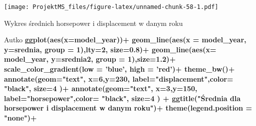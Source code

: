 \documentclass[
]{article}
\newenvironment{Shaded}{\begin{snugshade}}{\end{snugshade}}
\newcommand{\DataTypeTok}[1]{\textcolor[rgb]{0.13,0.29,0.53}{#1}}
\newcommand{\DecValTok}[1]{\textcolor[rgb]{0.00,0.00,0.81}{#1}}
\newcommand{\FloatTok}[1]{\textcolor[rgb]{0.00,0.00,0.81}{#1}}
\newcommand{\KeywordTok}[1]{\textcolor[rgb]{0.13,0.29,0.53}{\textbf{#1}}}
\newcommand{\NormalTok}[1]{#1}
\newcommand{\OperatorTok}[1]{\textcolor[rgb]{0.81,0.36,0.00}{\textbf{#1}}}
\newcommand{\StringTok}[1]{\textcolor[rgb]{0.31,0.60,0.02}{#1}}
\begin{document}
\texttt{[image: ProjektMS\_files/figure-latex/unnamed-chunk-58-1.pdf]}

Wykres średnich horsepower i displacement w danym roku

\begin{Shaded}
\begin{Highlighting}[]
\NormalTok{Autko }\OperatorTok{%>%}\StringTok{ }\KeywordTok{group_by}\NormalTok{(model_year)}\OperatorTok{%>%}\StringTok{ }\KeywordTok{summarise}\NormalTok{(}\DataTypeTok{srednia =} \KeywordTok{mean}\NormalTok{(horsepower), }\DataTypeTok{srednia2 =} \KeywordTok{mean}\NormalTok{(displacement)) }\OperatorTok{%>%}
\StringTok{  }\KeywordTok{ggplot}\NormalTok{(}\KeywordTok{aes}\NormalTok{(}\DataTypeTok{x=}\NormalTok{model_year))}\OperatorTok{+}
\StringTok{  }\KeywordTok{geom_line}\NormalTok{(}\KeywordTok{aes}\NormalTok{(}\DataTypeTok{x =}\NormalTok{ model_year, }\DataTypeTok{y=}\NormalTok{srednia, }\DataTypeTok{group =} \DecValTok{1}\NormalTok{),}\DataTypeTok{lty=}\DecValTok{2}\NormalTok{, }\DataTypeTok{size=}\FloatTok{0.8}\NormalTok{)}\OperatorTok{+}
\StringTok{  }\KeywordTok{geom_line}\NormalTok{(}\KeywordTok{aes}\NormalTok{(}\DataTypeTok{x=}\NormalTok{ model_year, }\DataTypeTok{y=}\NormalTok{srednia2, }\DataTypeTok{group =} \DecValTok{1}\NormalTok{),}\DataTypeTok{size=}\FloatTok{1.2}\NormalTok{)}\OperatorTok{+}
\StringTok{  }\KeywordTok{scale_color_gradient}\NormalTok{(}\DataTypeTok{low =} \StringTok{'blue'}\NormalTok{, }\DataTypeTok{high =} \StringTok{'red'}\NormalTok{)}\OperatorTok{+}
\StringTok{  }\KeywordTok{theme_bw}\NormalTok{()}\OperatorTok{+}
\StringTok{  }\KeywordTok{annotate}\NormalTok{(}\DataTypeTok{geom=}\StringTok{"text"}\NormalTok{, }\DataTypeTok{x=}\DecValTok{6}\NormalTok{,}\DataTypeTok{y=}\DecValTok{230}\NormalTok{,}
           \DataTypeTok{label=}\StringTok{"displacement"}\NormalTok{,}\DataTypeTok{color=} \StringTok{"black"}\NormalTok{, }\DataTypeTok{size=}\DecValTok{4}\NormalTok{ )}\OperatorTok{+}
\StringTok{  }\KeywordTok{annotate}\NormalTok{(}\DataTypeTok{geom=}\StringTok{"text"}\NormalTok{, }\DataTypeTok{x=}\DecValTok{3}\NormalTok{,}\DataTypeTok{y=}\DecValTok{150}\NormalTok{,}
           \DataTypeTok{label=}\StringTok{"horsepower"}\NormalTok{,}\DataTypeTok{color=} \StringTok{"black"}\NormalTok{, }\DataTypeTok{size=}\DecValTok{4}\NormalTok{ ) }\OperatorTok{+}
\StringTok{  }\KeywordTok{ggtitle}\NormalTok{(}\StringTok{"Średnia dla horsepower i displacement w danym roku"}\NormalTok{)}\OperatorTok{+}
\StringTok{  }\KeywordTok{theme}\NormalTok{(}\DataTypeTok{legend.position =} \StringTok{"none"}\NormalTok{)}\OperatorTok{+}
}
\end{Highlighting}
\end{Shaded}
\end{document}
